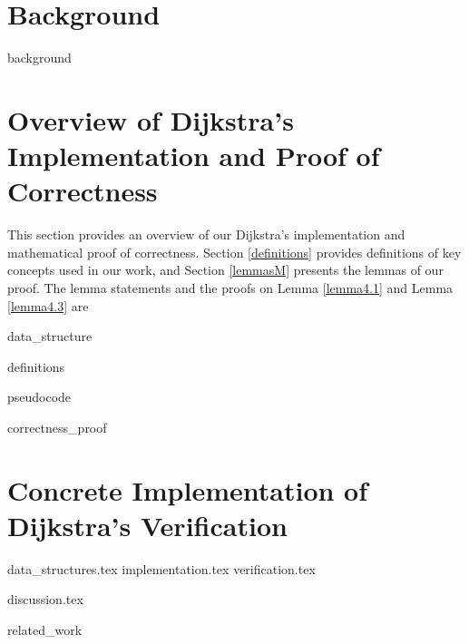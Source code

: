 \documentclass[11pt, a4paper]{article} %
\theoremstyle{definition}
\begin{document}
\section{Background}
{background}

\section{Overview of Dijkstra's Implementation and Proof of Correctness}
This section provides an overview of our Dijkstra's implementation and mathematical proof of correctness. Section \ref{definitions} provides definitions of key concepts used in our work, and Section \ref{lemmasM} presents the lemmas of our proof. The lemma statements and the proofs on Lemma \ref{lemma4.1} and Lemma \ref{lemma4.3} are 

{data_structure}

{definitions}

{pseudocode}

{correctness_proof}


\section{Concrete Implementation of Dijkstra's Verification}
{data_structures.tex}
{implementation.tex}
{verification.tex}


{discussion.tex}


{related_work}


\end{document}
